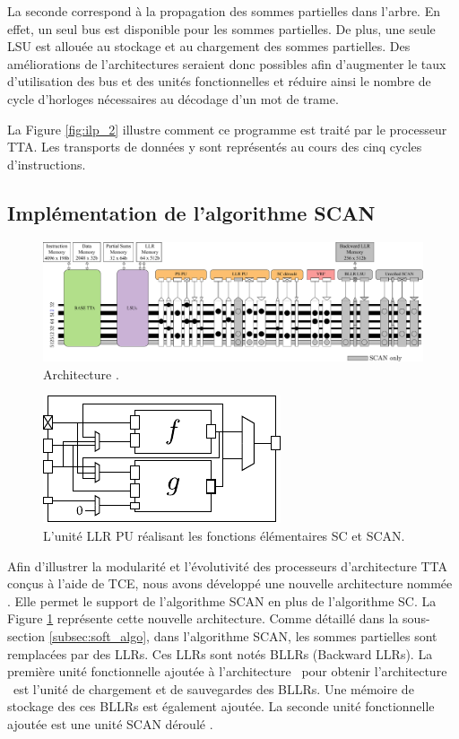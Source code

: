 La seconde correspond à la propagation des sommes partielles dans l'arbre. En effet, un seul bus est disponible pour les sommes partielles. De plus, une seule LSU est allouée au stockage et au chargement des sommes partielles. Des améliorations de l'architectures seraient donc possibles afin d'augmenter le taux d'utilisation des bus et des unités fonctionnelles et réduire ainsi le nombre de cycle d'horloges nécessaires au décodage d'un mot de trame.

La Figure \ref{fig:ilp_2} illustre comment ce programme est traité par le processeur TTA. Les transports de données y sont représentés au cours des cinq cycles d'instructions.



\subsection{Implémentation de l'algorithme SCAN}

\begin{figure}[htp]
	\centering
	\includegraphics[width=\textwidth]{main/ch4_fig/archi_scan}
	\caption{Architecture \TTSCAN.}
	\label{fig:tt_scan}
\end{figure}
\begin{figure}[htp]
\centering
\includegraphics[scale=1.5]{main/ch4_fig/scan_unit}
\caption{L'unité \og LLR PU \fg réalisant les fonctions élémentaires SC et SCAN.}
\label{fig:scan_unit}
\end{figure}

Afin d'illustrer la modularité et l'évolutivité des processeurs d'architecture TTA conçus à l'aide de TCE, nous avons développé une nouvelle architecture nommée \TTSCAN. Elle permet le support de l'algorithme SCAN en plus de l'algorithme SC. La Figure \ref{fig:tt_scan} représente cette nouvelle architecture.
Comme détaillé dans la sous-section \ref{subsec:soft_algo}, dans l'algorithme SCAN, les sommes partielles sont remplacées par des LLRs. Ces LLRs sont notés BLLRs (Backward LLRs). La première unité fonctionnelle ajoutée à l'architecture \TTSC~pour obtenir l'architecture \TTSCAN~est l'unité de chargement et de sauvegardes des BLLRs. Une mémoire de stockage des ces BLLRs est également ajoutée. La seconde unité fonctionnelle ajoutée est une unité \og SCAN déroulé \fg. 

